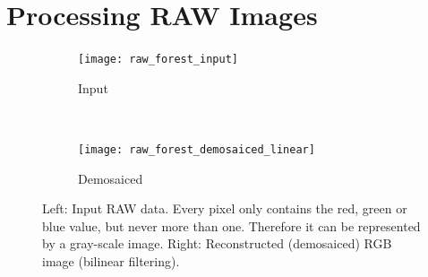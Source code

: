 \documentclass[a4paper]{article}
\begin{document}
\section{Processing RAW Images}

\begin{figure}[H]
	\centering
	\vspace{3mm}
	\begin{subfigure}[h]{0.48\textwidth}
		\centering
		\texttt{[image: raw\_forest\_input]}
		\caption*{Input}
	\end{subfigure}
	~
	\begin{subfigure}[h]{0.48\textwidth}
		\centering
		\texttt{[image: raw\_forest\_demosaiced\_linear]}
		\caption*{Demosaiced}
	\end{subfigure}	
\caption{Left: Input RAW data. Every pixel only contains the red, green or blue value, but never more than one. Therefore it can be represented by a gray-scale image. Right: Reconstructed (demosaiced) RGB image (bilinear filtering).}
\label{fig:demosaicLinForest}
\end{figure}
\end{document}
